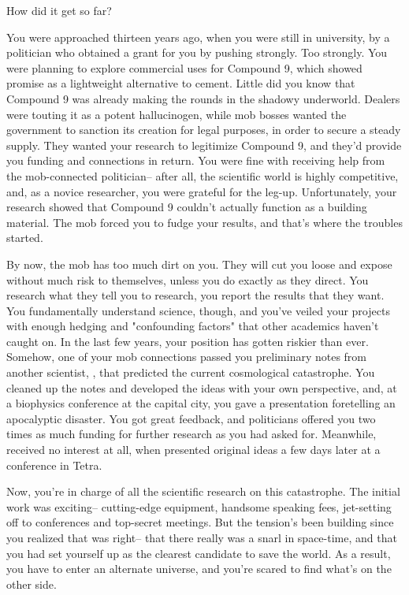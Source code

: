 \documentclass[char]{guildcamp3}
\begin{document}
\name{\cSciOne{}}


\updatemacro{\cNPC}{
  \unknownplayer 
  }

How did it get so far?

You were approached thirteen years ago, when you were still in university, by a politician who obtained a grant for you by pushing strongly. Too strongly. You were planning to explore commercial uses for Compound 9, which showed promise as a lightweight alternative to cement. Little did you know that Compound 9 was already making the rounds in the shadowy underworld. Dealers were touting it as a potent hallucinogen, while mob bosses wanted the government to sanction its creation for legal purposes, in order to secure a steady supply. They wanted your research to legitimize Compound 9, and they'd provide you funding and connections in return. You were fine with receiving help from the mob-connected politician-- after all, the scientific world is highly competitive, and, as a novice researcher, you were grateful for the leg-up. Unfortunately, your research showed that Compound 9 couldn't actually function as a building material. The mob forced you to fudge your results, and that's where the troubles started.

By now, the mob has too much dirt on you. They will cut you loose and expose without much risk to themselves, unless you do exactly as they direct. You research what they tell you to research, you report the results that they want. You fundamentally understand science, though, and you've veiled your projects with enough hedging and "confounding factors" that other academics haven't caught on. In the last few years, your position has gotten riskier than ever. Somehow, one of your mob connections passed you preliminary notes from another scientist, \cSciTwo{}, that predicted the current cosmological catastrophe. You cleaned up the notes and developed the ideas with your own perspective, and, at a biophysics conference at the capital city, you gave a presentation foretelling an apocalyptic disaster. You got great feedback, and politicians offered you two times as much funding for further research as you had asked for. Meanwhile, \cSciTwo{} received no interest at all, when \cSciTwo{\they} presented \cSciTwo{\their} original ideas a few days later at a conference in Tetra.

Now, you're in charge of all the scientific research on this catastrophe. The initial work was exciting-- cutting-edge equipment, handsome speaking fees, jet-setting off to conferences and top-secret meetings. But the tension's been building since you realized that \cSciTwo{} was right-- that there really was a snarl in space-time, and that you had set yourself up as the clearest candidate to save the world. As a result, you have to enter an alternate universe, and you're scared to find what's on the other side.
\end{document}
